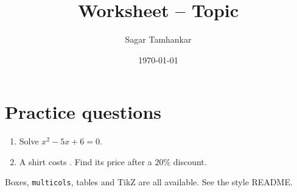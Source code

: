 \documentclass[student]{sagar-notes}
\title{Worksheet -- Topic}
\author{Sagar Tamhankar}
\date{\today}
\begin{document}
\maketitle

\section{Practice questions}
\begin{enumerate}[label=\arabic*.]
  \item Solve $x^2-5x+6=0$.
  \item A shirt costs . Find its price after a $20\%$ discount.
\end{enumerate}

\begin{noteBox}
Boxes, \texttt{multicols}, tables and TikZ are all available. See the style README.
\end{noteBox}
\end{document}
